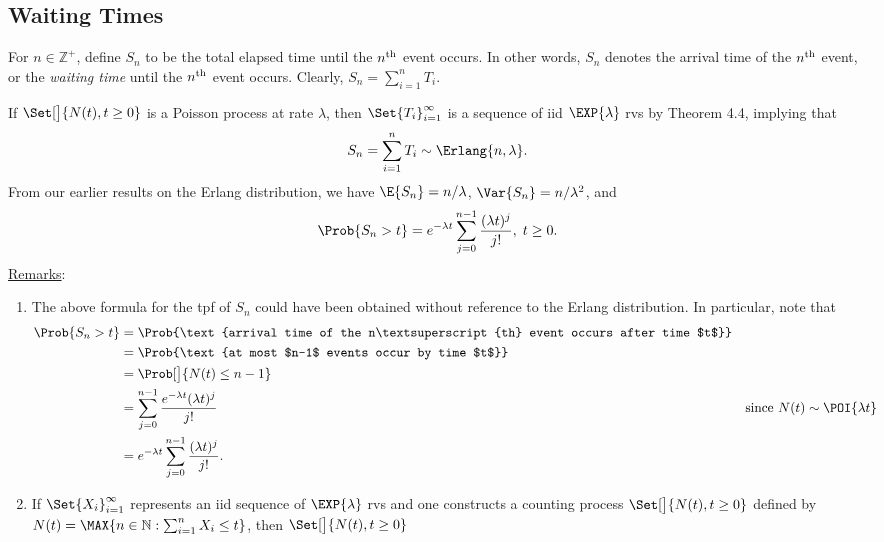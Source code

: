 \subsection*{Waiting Times}
\begin{Regular}
    For $ n\in\mathbb{Z}^+ $, define $ S_n $ to be the total elapsed time until the $ n\textsuperscript{th} $ event occurs. In other words,
    $ S_n $ denotes the arrival time of the $ n\textsuperscript{th} $ event, or the \emph{waiting time} until the $ n\textsuperscript{th} $
    event occurs. Clearly, $ S_n=\sum_{i=1}^{n}T_i $.

    If $ \Set[\big]{N(t),t\ge 0} $ is a Poisson process at rate $ \lambda $, then $ \Set{T_i}_{i=1}^\infty $ is a sequence of iid $ \EXP{\lambda} $
    rvs by Theorem 4.4, implying that
    \[ S_n=\sum_{i=1}^{n}T_i \sim \Erlang{n,\lambda}. \]
    From our earlier results on the Erlang distribution, we have $ \E{S_n}=n/\lambda $, $ \Var{S_n}=n/\lambda^2 $, and
    \[ \Prob{S_n>t}=e^{-\lambda t}\sum_{j=0}^{n-1}\frac{(\lambda t)^j}{j!},\; t\ge 0. \]
    \tcblower{}
    \underline{Remarks}:
    \begin{enumerate}[(1)]
        \item The above formula for the tpf of $ S_n $ could have been obtained without reference to the Erlang distribution. In particular, note that
              \begin{align*}
                  \Prob{S_n>t}
                   & =\Prob{\text{arrival time of the n\textsuperscript{th} event occurs after time $t$}}                                                \\
                   & =\Prob{\text{at most $n-1$ events occur by time $t$}}                                                                               \\
                   & =\Prob[\big]{N(t)\le n-1}                                                                                                           \\
                   & =\sum_{j=0}^{n-1}\frac{e^{-\lambda t}(\lambda t)^j}{j!}                              &  & \text{since $ N(t)\sim \POI{\lambda t} $} \\
                   & =e^{-\lambda t}\sum_{j=0}^{n-1}\frac{(\lambda t)^j}{j!}.
              \end{align*}
        \item If $ \Set{X_i}_{i=1}^\infty $ represents an iid sequence of $ \EXP{\lambda} $ rvs and one constructs a counting process
              $ \Set[\big]{N(t),t\ge 0} $ defined by $ N(t)=\MAX{n\in\mathbb{N}:\sum_{i=1}^{n}X_i\le t} $, then $ \Set[\big]{N(t),t\ge 0} $

\end{enumerate}
\end{Regular}
